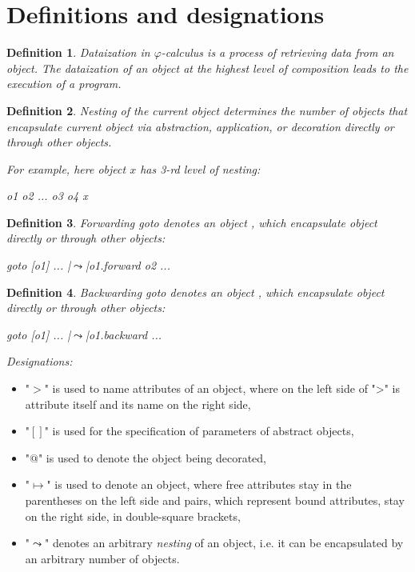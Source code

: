 \documentclass[sigplan,review,11pt,nonacm,natbib=false]{acmart}
\theoremstyle{theorems}
\newtheorem{eodefinition}{Definition}
\begin{document}
    \section{Definitions and designations}
    \begin{eodefinition}
        \emph{Dataization} in $\varphi$-calculus is a process of retrieving data from an object.
        The dataization of an object at the highest level of composition leads to the execution of a program.
    \end{eodefinition}
    \begin{eodefinition} \emph{Nesting} of the current object determines the number of objects that encapsulate current object via abstraction, application, or decoration directly or through other objects.

    For example, here object $x$ has 3-rd level of nesting:
    \begin{ffcode}
        o1
        o2
        ...
        o3
        o4
        x
    \end{ffcode}
    \end{eodefinition}
    \begin{eodefinition}
        \emph{Forwarding goto} denotes an object , which encapsulate object  directly or through other objects:
        \begin{ffcode}
            goto
            [o1]
            ...
            |$\leadsto$|o1.forward o2
            ...
        \end{ffcode}
    \end{eodefinition}
    \begin{eodefinition}
        \emph{Backwarding goto} denotes an object , which encapsulate object  directly or through other objects:
        \begin{ffcode}
            goto
            [o1]
            ...
            |$\leadsto$|o1.backward
            ...
        \end{ffcode}
    \end{eodefinition}
    \emph{Designations:}
    \begin{itemize}
        \item "$>$" is used to name attributes of an object, where on the left side of ">" is attribute itself and its name on the right side,
        \item "$[]$" is used for the specification of parameters of abstract objects,
        \item "$@$" is used to denote the object being decorated,
        \item "$\mapsto$" is used to denote an object, where free attributes stay in the parentheses on the left side and pairs, which represent bound attributes, stay on the right side, in double-square brackets,
        \item "$\leadsto$" denotes an arbitrary \emph{nesting} of an object, i.e. it can be encapsulated by an arbitrary number of objects.
    \end{itemize}
\end{document}
